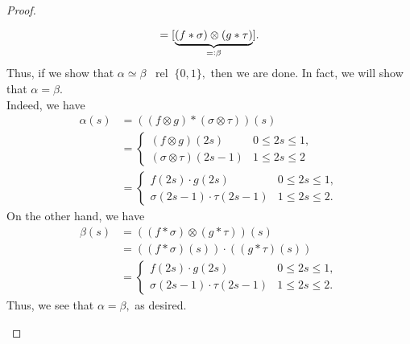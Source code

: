 \documentclass[12pt]{article}
\newcommand{\rel}{\;\;\operatorname{rel}\;}
\begin{document}
\begin{proof}
\begin{enumerate}
		\begin{equation*} 
			[\underbrace{(f \otimes g)*(\sigma \otimes \tau)}_{=\vcentcolon \alpha}] = [\underbrace{(f * \sigma) \otimes (g * \tau)}_{=\vcentcolon\beta}].
		\end{equation*}
		Thus, if we show that $\alpha \simeq \beta \rel \{0, 1\},$ then we are done. In fact, we will show that $\alpha = \beta.$\\
		Indeed, we have
		\begin{align*} 
			\alpha(s) &= \left((f \otimes g)*(\sigma \otimes \tau)\right)(s)\\
			&= \begin{cases}
				(f\otimes g)(2s) & 0 \le 2s \le 1,\\
				(\sigma \otimes \tau)(2s - 1) & 1 \le 2s \le 2
			\end{cases}\\
			&= \begin{cases}
				f(2s)\cdot g(2s) & 0 \le 2s \le 1,\\
				\sigma(2s - 1)\cdot\tau(2s - 1) & 1 \le 2s \le 2.
			\end{cases}
		\end{align*}
		On the other hand, we have
		\begin{align*} 
			\beta(s) &= \left((f * \sigma) \otimes (g * \tau)\right)(s)\\
			&= \left((f*\sigma)(s)\right)\cdot\left((g*\tau)(s)\right)\\
			&= \begin{cases}
				f(2s)\cdot g(2s) & 0 \le 2s \le 1,\\
				\sigma(2s - 1)\cdot\tau(2s - 1) & 1 \le 2s \le 2.
			\end{cases}
		\end{align*}
		Thus, we see that $\alpha = \beta,$ as desired. \qedhere
	\end{enumerate}
\end{proof}
\end{document}
